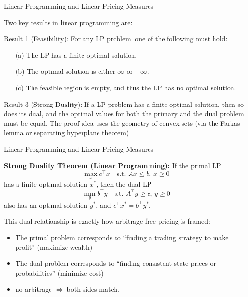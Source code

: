 \documentclass{beamer}
\begin{document}
\begin{frame}{Linear Programming and Linear Pricing Measures}

    {\footnotesize \footnotesize
    Two key results in linear programming are:

\par Result 1 (Feasibility): For any LP problem, one of the following must hold:
\begin{enumerate}
\item[(a)] The LP has a finite optimal solution.
\item[(b)] The optimal solution is either $\infty$ or $-\infty$.
\item[(c)] The feasible region is empty, and thus the LP has no optimal solution.
\end{enumerate}
\vspace{1em}
\vspace{1em}
\par Result 3 (Strong Duality):
If a LP problem has a finite optimal solution, then so does its dual,
 and the optimal values for both the primary and the dual problem must be equal.
 The proof idea uses the geometry of convex sets (via the Farkas lemma or separating hyperplane theorem)


    }
\end{frame}

\begin{frame}{Linear Programming and Linear Pricing Measures}

    {\footnotesize \footnotesize
    \par \textbf{Strong Duality Theorem (Linear Programming):}
    If the primal LP
    \[
    \max_{x} c^{\top} x \quad \text{s.t. } Ax \leq b, \, x \geq 0
    \]
    has a finite optimal solution $x^*$, then the dual LP
    \[
    \min_{y} b^{\top} y \quad \text{s.t. } A^{\top} y \geq c, \, y \geq 0
    \]
    also has an optimal solution $y^*$, and $ c^{\top} x^* = b^{\top} y^*.$
    \vspace{1em}
    \par This dual relationship is exactly how arbitrage-free pricing is framed:
    \begin{itemize}
        \item  The primal problem corresponds to ``finding a trading strategy to make profit'' (maximize wealth)
        \item  The dual problem corresponds to ``finding consistent state prices or probabilities'' (minimize cost)
        \item  no arbitrage $\Leftrightarrow$ both sides match.
    \end{itemize}
    }
\end{frame}
\end{document}
